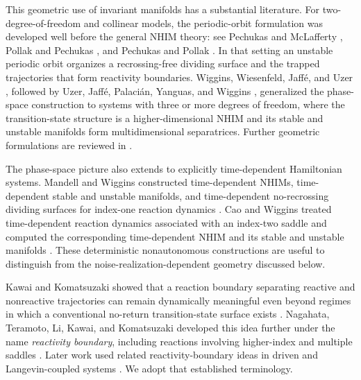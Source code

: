 \documentclass[11pt]{article}
\theoremstyle{definition}
\theoremstyle{remark}
\begin{document}
This geometric use of invariant manifolds has a substantial literature.  For two-degree-of-freedom and collinear models, the periodic-orbit formulation was developed well before the general NHIM theory: see Pechukas and McLafferty \cite{PechukasMcLafferty1973}, Pollak and Pechukas \cite{PollakPechukas1978}, and Pechukas and Pollak \cite{PechukasPollak1979}.  In that setting an unstable periodic orbit organizes a recrossing-free dividing surface and the trapped trajectories that form reactivity boundaries.  Wiggins, Wiesenfeld, Jaff\'e, and Uzer \cite{WigginsWiesenfeldJaffeUzer2001}, followed by Uzer, Jaff\'e, Palaci\'an, Yanguas, and Wiggins \cite{UzerEtAl2002}, generalized the phase-space construction to systems with three or more degrees of freedom, where the transition-state structure is a higher-dimensional NHIM and its stable and unstable manifolds form multidimensional separatrices.  Further geometric formulations are reviewed in \cite{WaalkensSchubertWiggins2008}.

The phase-space picture also extends to explicitly time-dependent Hamiltonian systems.  Mandell and Wiggins constructed time-dependent NHIMs, time-dependent stable and unstable manifolds, and time-dependent no-recrossing dividing surfaces for index-one reaction dynamics \cite{MandellWiggins2021}.  Cao and Wiggins treated time-dependent reaction dynamics associated with an index-two saddle and computed the corresponding time-dependent NHIM and its stable and unstable manifolds \cite{CaoWiggins2022}.  These deterministic nonautonomous constructions are useful to distinguish from the noise-realization-dependent geometry discussed below.

Kawai and Komatsuzaki showed that a reaction boundary separating reactive and nonreactive trajectories can remain dynamically meaningful even beyond regimes in which a conventional no-return transition-state surface exists \cite{KawaiKomatsuzaki2010}.  Nagahata, Teramoto, Li, Kawai, and Komatsuzaki developed this idea further under the name \emph{reactivity boundary}, including reactions involving higher-index and multiple saddles \cite{NagahataEtAl2013a,NagahataEtAl2013b}.  Later work used related reactivity-boundary ideas in driven and Langevin-coupled systems \cite{NagahataBorondoBenitoHernandez2020}.  We adopt that established terminology.
\end{document}
